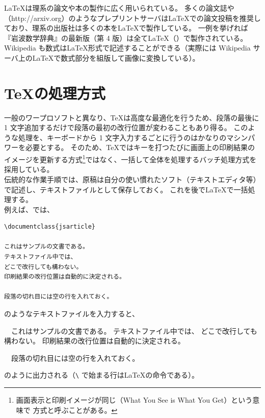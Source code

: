 \LaTeX{}は理系の論文や本の製作に広く用いられている。
多くの論文誌や （http://arxiv.org）のようなプレプリントサーバは\LaTeX{}での論文投稿を推奨しており、理系の出版社は多くの本を\LaTeX{}で製作している。
一例を挙げれば『岩波数学辞典』の最新版（第 4 版）は全て\LaTeX（\pLaTeXe）で製作されている。\\

Wikipedia も数式は\LaTeX{}形式で記述することができる（実際には Wikipedia サーバ上の\LaTeX{}で数式部分を組版して画像に変換している）。
\section{\TeX{}の処理方式}
一般のワープロソフトと異なり、\TeX{}は高度な最適化を行うため、段落の最後に 1 文字追加するだけで段落の最初の改行位置が変わることもあり得る。
このような処理を、キーボードから 1 文字入力するごとに行うのはかなりのマシンパワーを必要とする。
そのため、\TeX{}ではキーを打つたびに画面上の印刷結果のイメージを更新する方式\footnote{画面表示と印刷イメージが同じ（What You See is What You Get）という意味で  方式と呼ぶことがある。}ではなく、一括して全体を処理するバッチ処理方式を採用している。\\

伝統的な作業手順では、原稿は自分の使い慣れたソフト（テキストエディタ等）で記述し、テキストファイルとして保存しておく。
これを後で\LaTeX{}で一括処理する。\\

例えば、\LaTeXe{}では、
\begin{mdframed}[roundcorner=0.50zw,leftmargin=3.00zw,rightmargin=3.00zw,skipabove=0.40zw,skipbelow=0.40zw,innertopmargin=4.00pt,innerbottommargin=4.00pt,innerleftmargin=5.00pt,innerrightmargin=5.00pt,linecolor=gray!020,linewidth=0.50pt,backgroundcolor=gray!20]
\begin{verbatim}
\documentclass{jsarticle}

これはサンプルの文書である。
テキストファイル中では、
どこで改行しても構わない。
印刷結果の改行位置は自動的に決定される。

段落の切れ目には空の行を入れておく。

\end{verbatim}
\end{mdframed}
のようなテキストファイルを入力すると、
\begin{mdframed}[roundcorner=0.50zw,leftmargin=3.00zw,rightmargin=3.00zw,skipabove=0.40zw,skipbelow=0.40zw,innertopmargin=4.00pt,innerbottommargin=4.00pt,innerleftmargin=5.00pt,innerrightmargin=5.00pt,linecolor=gray!100,linewidth=0.50pt,backgroundcolor=gray!00]
  　これはサンプルの文書である。
  テキストファイル中では、
  どこで改行しても構わない。
  印刷結果の改行位置は自動的に決定される。

  　段落の切れ目には空の行を入れておく。
\end{mdframed}
のように出力される（\verb'\' で始まる行は\LaTeX{}の命令である）。\\

